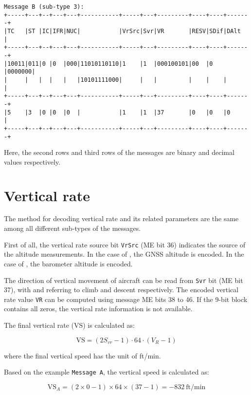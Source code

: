 \begin{verbatim}
Message B (sub-type 3):
+-----+---+--+---+---+-----------+-----+---+---------+----+----+-------+
|TC   |ST |IC|IFR|NUC|           |VrSrc|Svr|VR       |RESV|SDif|DAlt   |
+-----+---+--+---+---+-----------+-----+---+---------+----+----+-------+
|10011|011|0 |0  |000|11010110110|1    |1  |000100101|00  |0   |0000000|
|     |   |  |   |   |10101111000|     |   |         |    |    |       | 
+-----+---+--+---+---+-----------+-----+---+---------+----+----+-------+
|5    |3  |0 |0  |0  |           |1    |1  |37       |0   |0   |0      |
+-----+---+--+---+---+-----------+-----+---+---------+----+----+-------+
\end{verbatim}

Here, the second rows and third rows of the messages are binary and decimal values respectively.


\section{Vertical rate}

The method for decoding vertical rate and its related parameters are the same among all different sub-types of the messages.

First of all, the vertical rate source bit \texttt{VrSrc} (ME bit 36) indicates the source of the altitude measurements. In the case of \0, the GNSS altitude is encoded. In the case of \1, the barometer altitude is encoded.

The direction of vertical movement of aircraft can be read from \texttt{Svr} bit (ME bit 37), with \0 and \1 referring to climb and descent respectively. The encoded vertical rate value \texttt{VR} can be computed using message ME bits 38 to 46. If the 9-bit block contains all zeros, the vertical rate information is not available.

The final vertical rate ($\mathrm{VS}$) is calculated as:

\begin{equation}
  \mathrm{VS} = (2S_{vr} - 1) \cdot 64 \cdot (V_R - 1)
\end{equation}

where the final vertical speed has the unit of ft/min.

Based on the example \texttt{Message A}, the vertical speed is calculated as:

\begin{equation}
  \mathrm{VS}_A = (2 \times 0 - 1) \times 64 \times (37 -1) = -832 ~\text{ft/min}
\end{equation}

